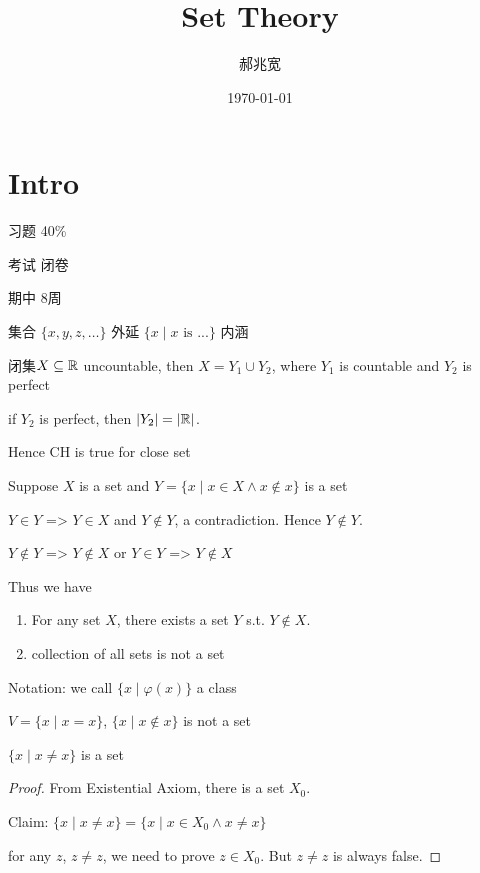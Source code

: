 \documentclass[11pt]{article}
\author{郝兆宽}
\date{\today}
\title{Set Theory}
\begin{document}
\maketitle
\tableofcontents

\section{Intro}
\label{sec:org0568da2}
习题 40\%

考试 闭卷

期中 8周

集合 \(\{x,y,z,\dots\}\) 外延 \(\{x\mid x\text{ is ...}\}\) 内涵

\begin{theorem}
闭集\(X\subseteq\mathbb{R}\) uncountable, then \(X=Y_1\cup Y_2\), where \(Y_1\) is countable and \(Y_2\) is perfect
\end{theorem}

if \(Y_2\) is perfect, then \(\abs{Y_2}=\abs{\R}\).

Hence CH is true for close set

Suppose \(X\) is a set and \(Y=\{x\mid x\in X\wedge x\not\in x\}\) is a set

\(Y\in Y\) => \(Y\in X\) and \(Y\not\in Y\), a contradiction. Hence \(Y\not\in Y\).

\(Y\not\in Y\) => \(Y\not\in X\) or \(Y\in Y\) => \(Y\not\in X\)

Thus we have
\begin{proposition}[]
\begin{enumerate}
\item For any set \(X\), there exists a set \(Y\) s.t. \(Y\not\in X\).
\item collection of all sets is not a set
\end{enumerate}
\end{proposition}

Notation: we call \(\{x\mid\varphi(x)\}\) a class

\(V=\{x\mid x=x\}\), \(\{x\mid x\not\in x\}\) is not a set

\begin{proposition}[]
\(\{x\mid x\neq x\}\) is a set
\end{proposition}

\begin{proof}
From Existential Axiom, there is a set \(X_0\).

Claim: \(\{x\mid x\neq x\}=\{x\mid x\in X_0\wedge x\neq x\}\)

for any \(z\), \(z\neq z\), we need to prove \(z\in X_0\). But \(z\neq z\) is always false.
\end{proof}
\end{document}
